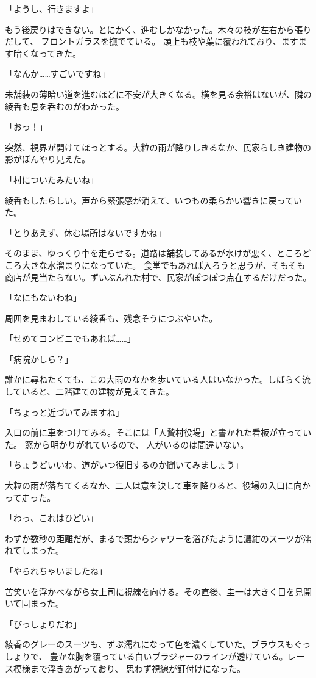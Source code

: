 ﻿\documentclass[
    book,tate,
    line_length=30zw,
    jafontsize=12pt,
    paper=b5j,
    landscape,
    ]{jlreq}
\begin{document}
「ようし、行きますよ」

もう後戻りはできない。とにかく、進むしかなかった。木々の枝が左右から張りだして、
フロントガラスを撫でている。 頭上も枝や葉に覆われており、ますます暗くなってきた。

「なんか……すごいですね」

未舗装の薄暗い道を進むほどに不安が大きくなる。横を見る余裕はないが、隣の綾香も息を呑むのがわかった。

「おっ！」

突然、視界が開けてほっとする。大粒の雨が降りしきるなか、民家らしき建物の影がぼんやり見えた。

「村についたみたいね」

綾香もしたらしい。声から緊張感が消えて、いつもの柔らかい響きに戻っていた。

「とりあえず、休む場所はないですかね」

そのまま、ゆっくり車を走らせる。道路は舗装してあるが水けが悪く、ところどころ大きな水溜まりになっていた。
食堂でもあれば入ろうと思うが、そもそも商店が見当たらない。ずいぶんれた村で、民家がぽつぽつ点在するだけだった。

「なにもないわね」

周囲を見まわしている綾香も、残念そうにつぶやいた。

「せめてコンビニでもあれば……」

「病院かしら？」

誰かに尋ねたくても、この大雨のなかを歩いている人はいなかった。しばらく流していると、二階建ての建物が見えてきた。

「ちょっと近づいてみますね」

入口の前に車をつけてみる。そこには「人贄村役場」と書かれた看板が立っていた。
窓から明かりがれているので、 人がいるのは間違いない。

「ちょうどいいわ、道がいつ復旧するのか聞いてみましょう」

大粒の雨が落ちてくるなか、二人は意を決して車を降りると、役場の入口に向かって走った。

「わっ、これはひどい」

わずか数秒の距離だが、まるで頭からシャワーを浴びたように濃紺のスーツが濡れてしまった。 

「やられちゃいましたね」

苦笑いを浮かべながら女上司に視線を向ける。その直後、圭一は大きく目を見開いて固まった。

「びっしょりだわ」

綾香のグレーのスーツも、ずぶ濡れになって色を濃くしていた。ブラウスもぐっしょりで、
豊かな胸を覆っている白いブラジャーのラインが透けている。レース模様まで浮きあがっており、
思わず視線が釘付けになった。
\end{document}
